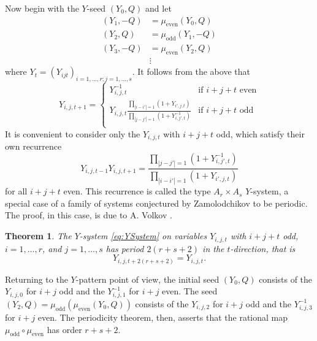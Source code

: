\documentclass{amsart}
\newtheorem{theorem}{Theorem}[section]
\theoremstyle{definition}
\theoremstyle{remark}
\numberwithin{equation}{section}
\begin{document}
	Now begin with the $Y$-seed $(Y_0,Q)$ and let 
	\begin{align*}
	(Y_1,-Q) &= \mu_{\textrm{even}}(Y_0,Q) \\ 
	(Y_2,Q) &= \mu_{\textrm{odd}}(Y_1,-Q) \\ 
	(Y_3,-Q) &= \mu_{\textrm{even}}(Y_2,Q) \\ 
	&\vdots
	\end{align*}
	where $Y_t = (Y_{ijt})_{i=1,\ldots, r; j=1,\ldots, s}$.  It follows from the above that
	\begin{displaymath}
		Y_{i,j,t+1} = \begin{cases}
		Y_{i,j,t}^{-1} & \textrm{if $i+j+t$ even} \\
		Y_{i,j,t}\frac{\displaystyle\prod_{|i-i'|=1}(1+Y_{i',j,t})}{\displaystyle\prod_{|j-j'|=1}(1+Y_{i,j',t}^{-1})} & \textrm{if $i+j+t$ odd} \\
		\end{cases}
	\end{displaymath}
	It is convenient to consider only the $Y_{i,j,t}$ with $i+j+t$ odd, which satisfy their own recurrence
	\begin{equation} \label{eq:YSystem}
		Y_{i,j,t-1}Y_{i,j,t+1} = \frac{\displaystyle\prod_{|j-j'|=1}(1+Y_{i,j',t}^{-1})}{\displaystyle\prod_{|i-i'|=1}(1+Y_{i',j,t})}
	\end{equation}
	for all $i+j+t$ even.  This recurrence is called the type $A_r \times A_s$ $Y$-system, a special case of a family of systems conjectured by Zamolodchikov to be periodic.  The proof, in this case, is due to A. Volkov \cite{V07}.
	
	\begin{theorem}
		The $Y$-system \eqref{eq:YSystem} on variables $Y_{i,j,t}$ with $i+j+t$ odd, $i=1,\ldots, r$, and $j=1,\ldots, s$ has period $2(r+s+2)$ in the $t$-direction, that is
		\begin{displaymath}
			Y_{i,j,t+2(r+s+2)} = Y_{i,j,t}.
		\end{displaymath}
	\end{theorem}
	
	Returning to the $Y$-pattern point of view, the initial seed $(Y_0,Q)$ consists of the $Y_{i,j,0}$ for $i+j$ odd and the $Y_{i,j,1}^{-1}$ for $i+j$ even.  The seed $(Y_2,Q) = \mu_{\textrm{odd}}(\mu_{\textrm{even}}(Y_0,Q))$ consists of the $Y_{i,j,2}$ for $i+j$ odd and the $Y_{i,j,3}^{-1}$ for $i+j$ even.  The periodicity theorem, then, asserts that the rational map $\mu_{\textrm{odd}} \circ \mu_{\textrm{even}}$ has order $r+s+2$.
	
\end{document}
